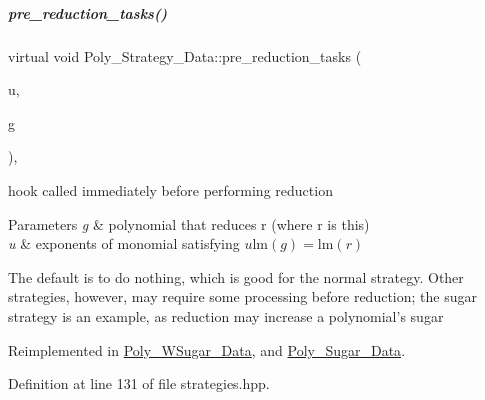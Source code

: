 \mbox{\label{group__strategygroup_a0d71db50c58a24f48f94eae6a48c2149}} 
\subparagraph{\texorpdfstring{pre\+\_\+reduction\+\_\+tasks()}{pre\_reduction\_tasks()}\hspace{0.1cm}{\footnotesize\ttfamily [2/2]}}
{\footnotesize\ttfamily virtual void Poly\+\_\+\+Strategy\+\_\+\+Data\+::pre\+\_\+reduction\+\_\+tasks (\begin{DoxyParamCaption}\item[{const E\+X\+P\+\_\+\+T\+Y\+PE $\ast$}]{u,  }\item[{const \hyperlink{group__polygroup_class_abstract___polynomial}{Abstract\+\_\+\+Polynomial} \&}]{g }\end{DoxyParamCaption})\hspace{0.3cm}{\ttfamily [inline]}, {\ttfamily [virtual]}}



hook called immediately before performing reduction 


\begin{DoxyParams}{Parameters}
{\em g} & polynomial that reduces {\ttfamily r} (where {\ttfamily r} is {\ttfamily this}) \\
\hline
{\em u} & exponents of monomial satisfying $u\textrm{lm}(g)=\textrm{lm}(r)$\\
\hline
\end{DoxyParams}
The default is to do nothing, which is good for the normal strategy. Other strategies, however, may require some processing before reduction; the sugar strategy is an example, as reduction may increase a polynomial's sugar 

Reimplemented in \hyperlink{group__strategygroup_a4a34039eb50a2294d2aaf6245c1833b8}{Poly\+\_\+\+W\+Sugar\+\_\+\+Data}, and \hyperlink{group__strategygroup_a284ca31b353017bdf4ea9b331218fff4}{Poly\+\_\+\+Sugar\+\_\+\+Data}.



Definition at line 131 of file strategies.\+hpp.

